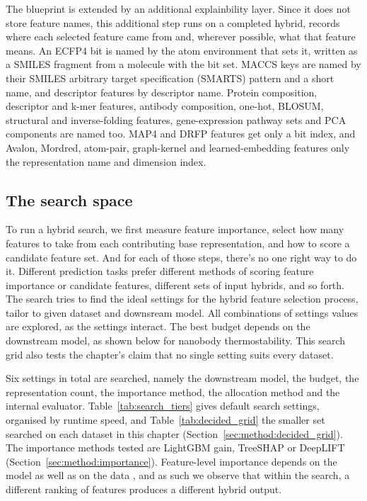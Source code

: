 The blueprint is extended by an additional explainbility layer. Since it does not store feature names, this additional step runs on a completed hybrid, records where each selected feature came from and, wherever possible, what that feature means. An ECFP4 bit is named by the atom environment that sets it, written as a SMILES fragment from a molecule with the bit set. MACCS keys are named by their SMILES arbitrary target specification (SMARTS) pattern and a short name, and descriptor features by descriptor name. Protein composition, descriptor and k-mer features, antibody composition, one-hot, BLOSUM, structural and inverse-folding features, gene-expression pathway sets and PCA components are named too. MAP4 and DRFP features get only a bit index, and Avalon, Mordred, atom-pair, graph-kernel and learned-embedding features only the representation name and dimension index.

\subsection{The search space}\label{sec:method:searchspace}
To run a hybrid search, we first measure feature importance, select how many features to take from each contributing base representation, and how to score a candidate feature set. And for each of those steps, there's no one right way to do it. Different prediction tasks prefer different methods of scoring feature importance or candidate features, different sets of input hybrids, and so forth. The search tries to find the ideal settings for the hybrid feature selection process, tailor to given dataset and downsream model. All combinations of settings values are explored, as the settings interact. The best budget depends on the downstream model, as shown below for nanobody thermostability. This search grid also tests the chapter's claim that no single setting suits every dataset.

Six settings in total are searched, namely the downstream model, the budget, the representation count, the importance method, the allocation method and the internal evaluator. Table~\ref{tab:search_tiers} gives default search settings, organised by runtime speed, and Table~\ref{tab:decided_grid} the smaller set searched on each dataset in this chapter (Section~\ref{sec:method:decided_grid}).  The importance methods tested are LightGBM gain, TreeSHAP or DeepLIFT (Section~\ref{sec:method:importance}). Feature-level importance depends on the model as well as on the data \citep{Dong2020}, and as such we observe that within the search, a different ranking of features produces a different hybrid output.


